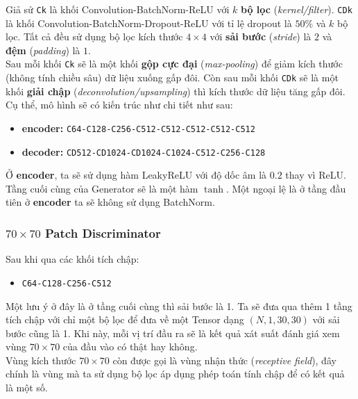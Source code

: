 \documentclass[a4paper]{article}
\begin{document}
\noindent
Giả sử \texttt{Ck} là khối Convolution-BatchNorm-ReLU với $k$ \textbf{bộ lọc} (\textit{kernel/filter}). \texttt{CDk} là khối Convolution-BatchNorm-Dropout-ReLU với tỉ lệ dropout là $50\%$ và $k$ bộ lọc. Tất cả đều sử dụng bộ lọc kích thước $4\times 4$ với \textbf{sải bước} (\textit{stride}) là $2$ và \textbf{đệm} (\textit{padding}) là $1$.\\
Sau mỗi khối \texttt{Ck} sẽ là một khối \textbf{gộp cực đại} (\textit{max-pooling}) để giảm kích thước (không tính chiều sâu) dữ liệu xuống gấp đôi. Còn sau mỗi khối \texttt{CDk} sẽ là một khối \textbf{giải chập} (\textit{deconvolution/upsampling}) thì kích thước dữ liệu tăng gấp đôi.\\
Cụ thể, mô hình sẽ có kiến trúc như chi tiết như sau:

\begin{itemize}
    \item \textbf{encoder:} \texttt{C64-C128-C256-C512-C512-C512-C512-C512}
    
    \item \textbf{decoder:} \texttt{CD512-CD1024-CD1024-C1024-C512-C256-C128}
\end{itemize}

\noindent
Ở \textbf{encoder}, ta sẽ sử dụng hàm LeakyReLU với độ dốc âm là $0.2$ thay vì ReLU. Tầng cuối cùng của Generator sẽ là một hàm $\tanh$. Một ngoại lệ là ở tầng đầu tiên ở \textbf{encoder} ta sẽ không sử dụng BatchNorm.

\subsubsection{$70\times 70$ Patch Discriminator}
Sau khi qua các khối tích chập:

\begin{itemize}
    \item \texttt{C64-C128-C256-C512}
\end{itemize}

\noindent
Một lưu ý ở đây là ở tầng cuối cùng thì sải bước là 1. Ta sẽ đưa qua thêm 1 tầng tích chập với chỉ một bộ lọc để đưa về một Tensor dạng $(N, 1, 30, 30)$ vởi sải bước cũng là 1. Khi này, mỗi vị trí đầu ra sẽ là kết quả xát suất đánh giá xem vùng $70 \times 70$ của đầu vào có thật hay không.\\
Vùng kích thước $70\times 70$ còn được gọi là vùng nhận thức (\textit{receptive field}), đây chính là vùng mà ta sử dụng bộ lọc áp dụng phép toán tính chập để có kết quả là một số.\\
\end{document}
